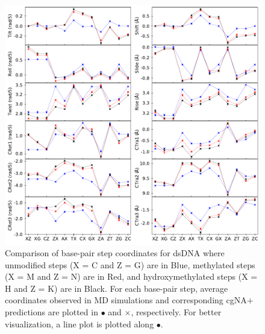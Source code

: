 \clearpage

\begin{figure}[H]
\begin{center}
 \includegraphics[width=15cm]{images/compare_dim_gs_DNA_MDNA_HDNA_gs.pdf}
\end{center}
\centering\caption{
Comparison of base-pair step coordinates for dsDNA where unmodified steps (X = C and Z = G) are in Blue, methylated steps (X = M and Z = N) are in Red, and hydroxymethylated steps (X = H and Z = K) are in Black. For each base-pair step, average coordinates observed in MD simulations and corresponding cgNA$+$ predictions are plotted in $\bullet$ and $\times$, respectively.
For better visualization, a line plot is plotted along $\bullet$.
}
\label{c6:fig3_dimercomp}
\end{figure}



